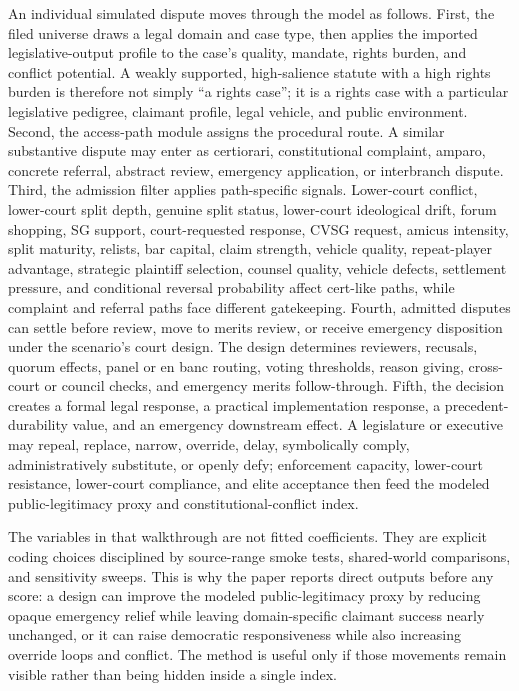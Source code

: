 \documentclass[
    journal=jlc,
    manuscript=research-article,
    year=2026,
  ]{cup-journal}
\begin{document}
An individual simulated dispute moves through the model as follows. First, the filed universe draws a legal domain and case type, then applies the imported legislative-output profile to the case's quality, mandate, rights burden, and conflict potential. A weakly supported, high-salience statute with a high rights burden is therefore not simply ``a rights case''; it is a rights case with a particular legislative pedigree, claimant profile, legal vehicle, and public environment. Second, the access-path module assigns the procedural route. A similar substantive dispute may enter as certiorari, constitutional complaint, amparo, concrete referral, abstract review, emergency application, or interbranch dispute. Third, the admission filter applies path-specific signals. Lower-court conflict, lower-court split depth, genuine split status, lower-court ideological drift, forum shopping, SG support, court-requested response, CVSG request, amicus intensity, split maturity, relists, bar capital, claim strength, vehicle quality, repeat-player advantage, strategic plaintiff selection, counsel quality, vehicle defects, settlement pressure, and conditional reversal probability affect cert-like paths, while complaint and referral paths face different gatekeeping. Fourth, admitted disputes can settle before review, move to merits review, or receive emergency disposition under the scenario's court design. The design determines reviewers, recusals, quorum effects, panel or en banc routing, voting thresholds, reason giving, cross-court or council checks, and emergency merits follow-through. Fifth, the decision creates a formal legal response, a practical implementation response, a precedent-durability value, and an emergency downstream effect. A legislature or executive may repeal, replace, narrow, override, delay, symbolically comply, administratively substitute, or openly defy; enforcement capacity, lower-court resistance, lower-court compliance, and elite acceptance then feed the modeled public-legitimacy proxy and constitutional-conflict index.

The variables in that walkthrough are not fitted coefficients. They are explicit coding choices disciplined by source-range smoke tests, shared-world comparisons, and sensitivity sweeps. This is why the paper reports direct outputs before any score: a design can improve the modeled public-legitimacy proxy by reducing opaque emergency relief while leaving domain-specific claimant success nearly unchanged, or it can raise democratic responsiveness while also increasing override loops and conflict. The method is useful only if those movements remain visible rather than being hidden inside a single index.
\end{document}
